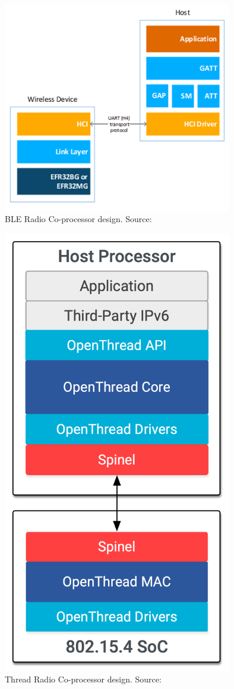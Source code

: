 \begin{figure}
    \centering
    \includegraphics[width=100mm, keepaspectratio]{figures/silabs-ble-rcp-QSG169.png}
    \caption{BLE Radio Co-processor design. Source: \cite{silabs:qsg169}}
    \label{fig:mp:ble-rcp}
\end{figure}
\begin{figure}
    \centering
    \includegraphics[width=100mm, keepaspectratio]{figures/ot-arch-rcp-vert_2x.png}
    \caption{Thread Radio Co-processor design. Source: \cite{thread:platforms}}
    \label{fig:mp:thread-rcp}
\end{figure}

